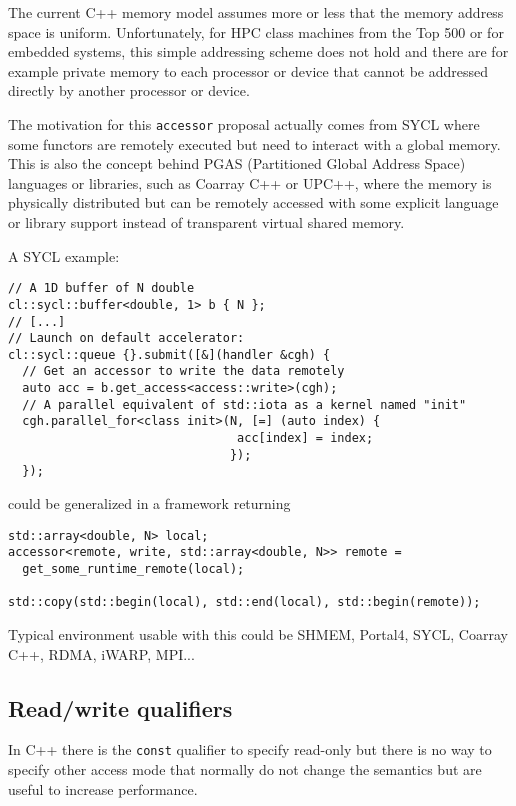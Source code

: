 \documentclass[a4paper]{article}
\begin{document}
The current C++ memory model assumes more or less that the memory
address space is uniform. Unfortunately, for HPC class machines from
the Top 500 or for embedded systems, this simple addressing scheme
does not hold and there are for example private memory to each
processor or device that cannot be addressed directly by another
processor or device.

The motivation for this \lstinline|accessor| proposal actually comes
from SYCL where some functors are remotely executed but need to
interact with a global memory. This is also the concept behind PGAS
(Partitioned Global Address Space) languages or libraries, such as
Coarray C++ or UPC++, where the memory is physically distributed but
can be remotely accessed with some explicit language or library
support instead of transparent virtual shared memory.

A SYCL example:
\begin{lstlisting}
// A 1D buffer of N double
cl::sycl::buffer<double, 1> b { N };
// [...]
// Launch on default accelerator:
cl::sycl::queue {}.submit([&](handler &cgh) {
  // Get an accessor to write the data remotely
  auto acc = b.get_access<access::write>(cgh);
  // A parallel equivalent of std::iota as a kernel named "init"
  cgh.parallel_for<class init>(N, [=] (auto index) {
                                acc[index] = index;
                               });
  });
\end{lstlisting}

could be generalized in a framework returning
\begin{lstlisting}
std::array<double, N> local;
accessor<remote, write, std::array<double, N>> remote =
  get_some_runtime_remote(local);

std::copy(std::begin(local), std::end(local), std::begin(remote));
\end{lstlisting}

Typical environment usable with this could be SHMEM, Portal4, SYCL,
Coarray C++, RDMA, iWARP, MPI...


\subsection{Read/write qualifiers}
\label{sec:readwrite-qualifiers}

In C++ there is the \lstinline|const| qualifier to specify read-only
but there is no way to specify other access mode that normally do not
change the semantics but are useful to increase performance.
\end{document}
